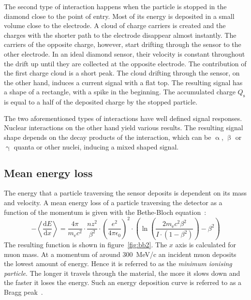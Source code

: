 The second type of interaction happens when the particle is stopped in the diamond close to the point of entry. Most of its energy is deposited in a small volume close to the electrode. A cloud of charge carriers is created and the charges with the shorter path to the electrode disappear almost instantly. The carriers of the opposite charge, however, start drifting through the sensor to the other electrode. In an ideal diamond sensor, their velocity is constant throughout the drift up until they are collected at the opposite electrode. The contribution of the first charge cloud is a short peak. The cloud drifting through the sensor, on the other hand, induces a current signal with a flat top. The resulting signal has a shape of a rectangle, with a spike in the beginning. %
The accumulated charge $Q_\mathrm{s}$ is equal to a half of the deposited charge by the stopped particle.

The two aforementioned types of interactions have well defined signal responses. Nuclear interactions on the other hand yield various results. The resulting signal shape depends on the decay products of the interaction, which can be $\upalpha$, $\upbeta$ or $\upgamma$ quanta or other nuclei, inducing a mixed shaped signal. 


\subsection{Mean energy loss}
The energy that a particle traversing the sensor deposits is dependent on its mass and velocity. A mean energy loss of a particle traversing the detector as a function of the momentum is given with the Bethe-Bloch equation~\cite{BETHE:00001}: 
\begin{equation}
-\left\langle\frac{\mathrm{d}E}{\mathrm{d}x}\right\rangle = \frac{4\pi}{m_\mathrm{e}c^2}  \cdot \frac{nz^2}{\beta^2}  \cdot  \left(\frac{e^2}{4\pi\epsilon_\mathrm{0}}\right)^2  \cdot  \left( \ln \left(\frac{2m_\mathrm{e}c^2\beta^2}{I\cdot(1-\beta^2)}\right)-\beta^2  \right)
\label{eq:bethebloch}
\end{equation}
The resulting function is shown in figure~\ref{fig:bb2}. The $x$ axis is calculated for muon mass. At a momentum of around 300~MeV/c an incident muon deposits the lowest amount of energy. Hence it is referred to as the \emph{minimum ionising particle}. The longer it travels through the material, the more it slows down and the faster it loses the energy. Such an energy deposition curve is referred to as a Bragg peak~\cite{Kotte:172812}.

